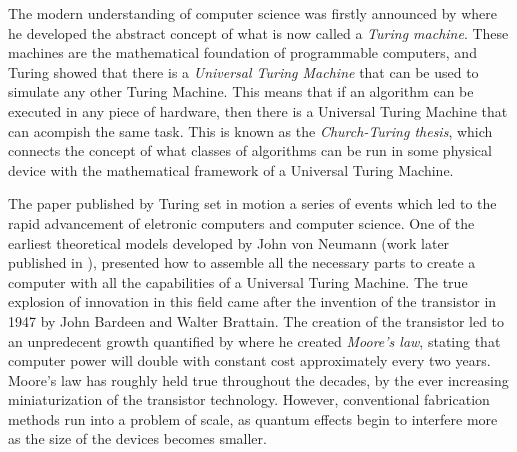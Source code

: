 \documentclass[../../dissertation.tex]{subfiles}
\begin{document}
The modern understanding of computer science was firstly announced by
\cite{turing1936} where he developed the abstract concept of what is now called
a \textit{Turing machine}. These machines are the mathematical foundation of
programmable computers, and Turing showed that there is a \textit{Universal
Turing Machine} that can be used to simulate any other Turing Machine. This
means that if an algorithm can be executed in any piece of hardware, then there
is a Universal Turing Machine that can acompish the same task. This is known as
the \textit{Church-Turing thesis}, which connects the concept of what classes
of algorithms can be run in some physical device with the mathematical
framework of a Universal Turing Machine.\par The paper published by Turing set
in motion a series of events which led to the rapid advancement of eletronic
computers and computer science. One of the earliest theoretical models
developed by John von Neumann (work later published in \cite{Neumann93} ),
presented how to assemble all the necessary parts to create a computer with all
the capabilities of a Universal Turing Machine. The true explosion of
innovation in this field came after the invention of the transistor in 1947 by
John Bardeen and Walter Brattain. The creation of the transistor led to an
unpredecent growth quantified by  \cite{moore1965} where he created
\textit{Moore's law}, stating that computer power will double with constant
cost approximately every two years. Moore's law has roughly held true
throughout the decades, by the ever increasing miniaturization of the
transistor technology. However, conventional fabrication methods run into a
problem of scale, as quantum effects begin to interfere more as the size of the
devices becomes smaller.\par
\end{document}
